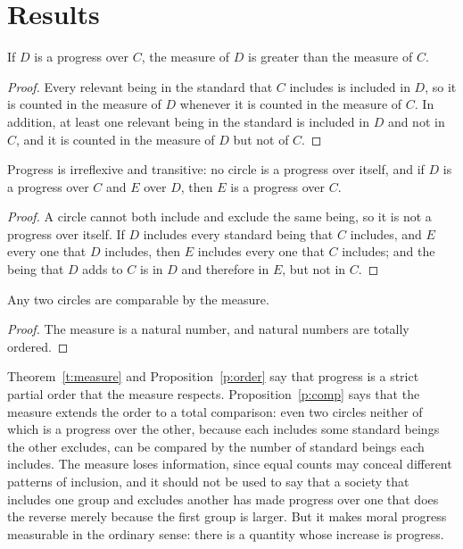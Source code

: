 \documentclass{situationist-preprint}
\begin{document}
\section{Results}\label{s:results}

\begin{theorem}\label{t:measure}
If $D$ is a progress over $C$, the measure of $D$ is greater than the measure of $C$.
\end{theorem}

\begin{proof}
Every relevant being in the standard that $C$ includes is included in $D$, so it is counted in the measure of $D$ whenever it is counted in the measure of $C$. In addition, at least one relevant being in the standard is included in $D$ and not in $C$, and it is counted in the measure of $D$ but not of $C$.
\end{proof}

\begin{proposition}\label{p:order}
Progress is irreflexive and transitive: no circle is a progress over itself, and if $D$ is a progress over $C$ and $E$ over $D$, then $E$ is a progress over $C$.
\end{proposition}

\begin{proof}
A circle cannot both include and exclude the same being, so it is not a progress over itself. If $D$ includes every standard being that $C$ includes, and $E$ every one that $D$ includes, then $E$ includes every one that $C$ includes; and the being that $D$ adds to $C$ is in $D$ and therefore in $E$, but not in $C$.
\end{proof}

\begin{proposition}\label{p:comp}
Any two circles are comparable by the measure.
\end{proposition}

\begin{proof}
The measure is a natural number, and natural numbers are totally ordered.
\end{proof}

Theorem~\ref{t:measure} and Proposition~\ref{p:order} say that progress is a strict partial order that the measure respects. Proposition~\ref{p:comp} says that the measure extends the order to a total comparison: even two circles neither of which is a progress over the other, because each includes some standard beings the other excludes, can be compared by the number of standard beings each includes. The measure loses information, since equal counts may conceal different patterns of inclusion, and it should not be used to say that a society that includes one group and excludes another has made progress over one that does the reverse merely because the first group is larger. But it makes moral progress measurable in the ordinary sense: there is a quantity whose increase is progress.
\end{document}
